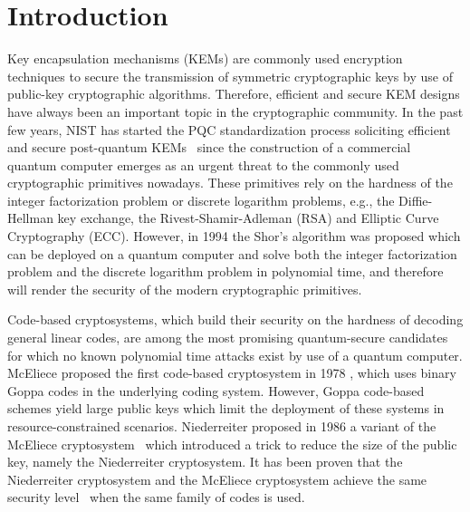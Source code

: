 \documentclass[runningheads]{llncs}
\begin{document}
\section{Introduction}
Key encapsulation mechanisms (KEMs) are commonly used encryption techniques 
to secure the transmission of symmetric cryptographic keys 
by use of public-key cryptographic algorithms. 
Therefore, efficient and secure KEM designs have always been an important topic
in the cryptographic community. 
In the past few years, NIST has started the PQC standardization process
soliciting efficient and secure post-quantum KEMs~\cite{chen2016report}
since the construction of a commercial quantum computer emerges as an urgent
threat to the commonly used cryptographic primitives nowadays.
These primitives rely on the hardness of the integer factorization problem or 
discrete logarithm problems, e.g., the Diffie-Hellman key exchange, 
the Rivest-Shamir-Adleman (RSA) and Elliptic Curve Cryptography (ECC). 
However, in 1994 the Shor's algorithm \cite{shor1997polynomial} was proposed
which can be deployed 
on a quantum computer and solve both the integer factorization problem 
and the discrete logarithm problem in polynomial time, and therefore will
render the security of the modern cryptographic primitives. 

Code-based cryptosystems, which build their security on the hardness of 
decoding general linear codes, are among the most promising quantum-secure
candidates for which no known polynomial time attacks exist by use of a quantum computer.
McEliece proposed the first code-based cryptosystem in 1978 \cite{mceliece1978public},
which uses binary Goppa codes \cite{goppa1970new} in the underlying coding system. 
However, Goppa code-based schemes yield large public keys which limit 
the deployment of these systems in resource-constrained scenarios. 
Niederreiter proposed in 1986 a variant of the McEliece cryptosystem~\cite{niederreiter1986knapsack}
which introduced a trick to reduce the size of the public key,
namely the Niederreiter cryptosystem.
It has been proven that the Niederreiter cryptosystem and the McEliece cryptosystem
achieve the same security level~\cite{li1994equivalence} when the same family of codes is used.
\end{document}
